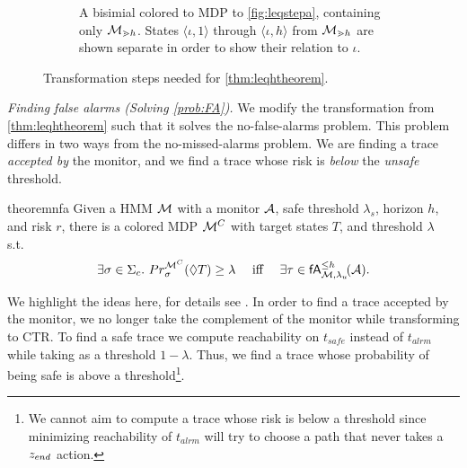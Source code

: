 \documentclass[runningheads]{llncs}
\newcommand{\talrm}{t_{alrm}}
\newcommand{\tsafe}{t_{safe}}
\newcommand{\en}{z_{\color{black} end}\xspace}
\newcommand{\falsealarms}[2]{\mathsf{fA}_{#1}^{#2}}
\newcommand{\ccSched}{\Sigma_c}
\renewcommand{\paragraph}[1]{\smallskip\noindent\emph{#1}}
\begin{document}
\begin{figure}[t]
\begin{subfigure}{.48\linewidth}
        \caption{A bisimial colored to MDP to \cref{fig:leqstepa}, containing only $\mathcal{M}_{\gtrdot h}$. States $\langle \iota, 1\rangle$ through $\langle \iota, h\rangle$ from $\mathcal{M}_{\gtrdot h}$ are shown separate in order to show their relation to $\iota$.}
        \label{fig:leqstepb}
    \end{subfigure}
    \caption{Transformation steps needed for \cref{thm:leqhtheorem}.}
    \label{fig:leqhorizon}
\end{figure}

\paragraph{Finding false alarms (Solving \cref{prob:FA}).}
We modify the transformation from \cref{thm:leqhtheorem} such that it solves the no-false-alarms problem.
This problem differs in two ways from the no-missed-alarms problem. We are finding a trace \emph{accepted by} the monitor, and we find a trace whose risk is \emph{below} the \emph{unsafe} threshold.
\begin{restatable}{theorem}{nfa}
    \label{thm:nfa}
    Given a HMM $\mathcal{M}$ with a monitor $\mathcal{A}$, safe threshold $\lambda_s$, horizon $h$, and risk $r$, there is a colored MDP $\mathcal{M}^{C}$ with target states $T$, and threshold $\lambda$ s.t.\
    \[ \exists \sigma \in \ccSched.\ \Prob^{\mdpc}_{\sigma}(\lozenge T) \geq \lambda\quad\text{ iff }\quad \exists \tau\in \falsealarms{\mc,\lambda_u}{\leq h}\!(\dfa).\]
\end{restatable}
\noindent We highlight the ideas here, for details see .
In order to find a trace accepted by the monitor, we no longer take the complement of the monitor while transforming to CTR. To find a safe trace we compute reachability on $\tsafe$ instead of $\talrm$ while taking as a threshold $1-\lambda$. Thus, we find a trace whose probability of being safe is above a threshold\footnote{We cannot aim to compute a trace whose risk is below a threshold since minimizing reachability of $\talrm$ will try to choose a path that never takes a $\en$ action.}.
\end{document}
